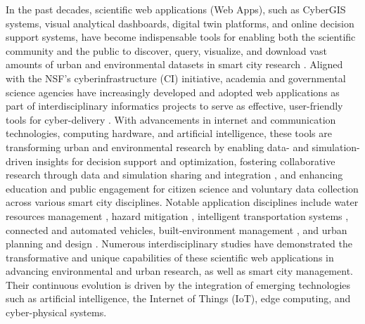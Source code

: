 In the past decades, scientific web applications (Web Apps), such as CyberGIS systems, visual analytical dashboards, digital twin platforms, and online decision support systems, have become indispensable tools for enabling both the scientific community and the public to discover, query, visualize, and download vast amounts of urban and environmental datasets in smart city research \citep{ferre2022adoption, dembski2020urban}. Aligned with the NSF's cyberinfrastructure (CI) initiative, academia and governmental science agencies have increasingly developed and adopted web applications as part of interdisciplinary informatics projects to serve as effective, user-friendly tools for cyber-delivery \citep{yu2021coevolution}. With advancements in internet and communication technologies, computing hardware, and artificial intelligence, these tools are transforming urban and environmental research by enabling data- and simulation-driven insights for decision support and optimization\citep{kadupitige2022enhancing}, fostering collaborative research through data and simulation sharing and integration \citep{parashar2019virtual}, and enhancing education and public engagement for citizen science and voluntary data collection \citep{skarlatidou2019volunteers} across various smart city disciplines. Notable application disciplines include water resources management \citep{souffront2018cyberinfrastructure, xu2022overview}, hazard mitigation \citep{mandal2024prime, xu2020web, garg2018cloud}, intelligent transportation systems \citep{xu2023smart, xu2022interactive, ghosh2017intelligent}, connected and automated vehicles\citep{xu2023mobile, kampmann2019dynamic}, built-environment management \citep{jia2019adopting, kim2022design}, and urban planning and design \citep{alatalo2017two}. Numerous interdisciplinary studies have demonstrated the transformative and unique capabilities of these scientific web applications in advancing environmental and urban research, as well as smart city management. Their continuous evolution is driven by the integration of emerging technologies such as artificial intelligence, the Internet of Things (IoT), edge computing, and cyber-physical systems. 

